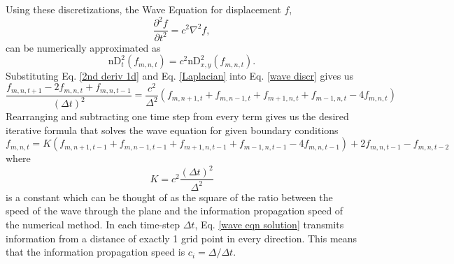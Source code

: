 \documentclass{article}
\begin{document}
Using these discretizations, the Wave Equation for displacement $f$,
\begin{equation} \label{wave equation}
\frac{\partial^2f}{\partial t^2}=c^2\nabla^2f,
\end{equation}
can be numerically approximated as
\begin{equation} \label{wave discr}
\mbox{nD}_t^2(f_{m,n,t})=c^2\mbox{nD}_{x,y}^2(f_{m,n,t}).
\end{equation}
Substituting Eq. \ref{2nd deriv 1d} and Eq. \ref{Laplacian} into Eq. \ref{wave discr} gives us
\begin{equation*}
\frac{f_{m,n,t+1}-2f_{m,n,t}+f_{m,n,t-1}}{(\Delta t)^2}=\frac{c^2}{\Delta^2}(f_{m,n+1,t}+f_{m,n-1,t}+f_{m+1,n,t}+f_{m-1,n,t}-4f_{m,n,t})
\end{equation*}
Rearranging and subtracting one time step from every term gives us the desired iterative formula that solves the wave equation for given boundary conditions
\begin{equation} \label{wave eqn solution}
\boxed{f_{m,n,t}=K(f_{m,n+1,t-1}+f_{m,n-1,t-1}+f_{m+1,n,t-1}+f_{m-1,n,t-1}-4f_{m,n,t-1})+2f_{m,n,t-1}-f_{m,n,t-2}}
\end{equation}
where
\begin{equation} \label{K}
K=c^2\frac{(\Delta t)^2}{\Delta^2}
\end{equation}
is a constant which can be thought of as the square of the ratio between the speed of the wave through the plane and the information propagation speed of the numerical method. In each time-step $\Delta t$, Eq. \ref{wave eqn solution} transmits information from a distance of exactly 1 grid point in every direction. This means that the information propagation speed is $c_{i}=\Delta / \Delta t$.
\end{document}
